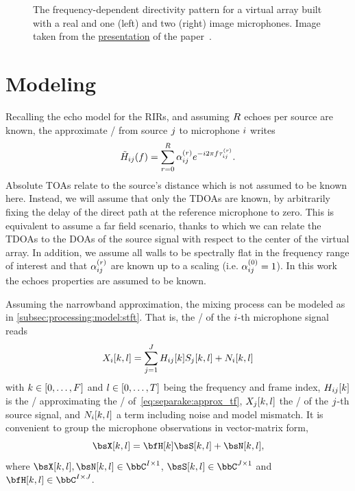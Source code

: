 \begin{figure}
    \begin{fullwidth}
    \centering
    \resizebox{\linewidth}{!}{
        
    }
    \caption{The frequency-dependent directivity pattern for a virtual array built with a real and one (left) and two (right) image microphones.
    Image taken from the \href{https://sigport.org/documents/separake-source-separation-little-help-echoes}{presentation} of the paper~.}
    \label{fig:separake:directivity}
    \end{fullwidth}
\end{figure}

\section{Modeling}
Recalling the echo model for the \acp{RIR}, and assuming $R$ echoes per source are known, the approximate \RTFdef/ from source $j$ to microphone $i$ writes
\begin{equation}
    \label{eq:separake:approx_tf}
    \tilde{H}_{ij}(f) = \sum_{r=0}^{R} \alpha_{ij}^{(r)} {e}^{-{i} 2 \pi f \tau_{ij}^{(r)}}.
\end{equation}
Absolute \acsp{TOA} relate to the source's distance which is not assumed to be known here.
Instead, we will assume that only the \acp{TDOA} are known, by arbitrarily fixing the delay of the direct path at the reference microphone to zero.
This is equivalent to assume a far field scenario, thanks to which we can relate the \acp{TDOA} to the \acfp{DOA} of the source signal with respect to the center of the virtual array.
In addition, we assume all walls to be spectrally flat in the frequency range of interest and that $\alpha_{ij}^{(r)}$ are known up to a scaling (i.e. $\alpha_{ij}^{(0)} = 1$).
In this work the echoes properties are assumed to be known.

\mynewline
Assuming the narrowband approximation, the mixing process can be modeled as in \cref{subsec:processing:model:stft}.
That is, the \STFTdef/ of the $i$-th microphone signal reads
\begin{equation}
    \label{eq:separake:stft}
    X_{i}[k,l] = \sum_{j = 1}^{J} H_{ij}[k] S_{j}[k,l] + N_{i}[k,l]
\end{equation}
with $k\in\klist{0,\ldots,F}$ and $l\in\klist{0,\ldots,T}$ being the frequency and frame index,
$H_{ij}[k]$ is the \DFT/ approximating the \RTF/ of~\eqref{eq:separake:approx_tf},
$X_{j}[k,l]$ the \STFT/ of the $j$-th source signal, and $N_{i}[k,l]$ a term including noise and model mismatch.
It is convenient to group the microphone observations in vector-matrix form,
\begin{equation}
    \MICS[k,l] = \FLTSS[k]\SRCS[k,l] + \NSES[k,l]
    ,
\end{equation}
where $\MICS[k,l],  \NSES[k,l] \in \bbC^{\numMics \times 1}$, $\SRCS[k,l] \in \bbC^{\numSrcs \times 1}$ and $\FLTSS[k,l] \in \bbC^{\numMics \times \numSrcs}$.

